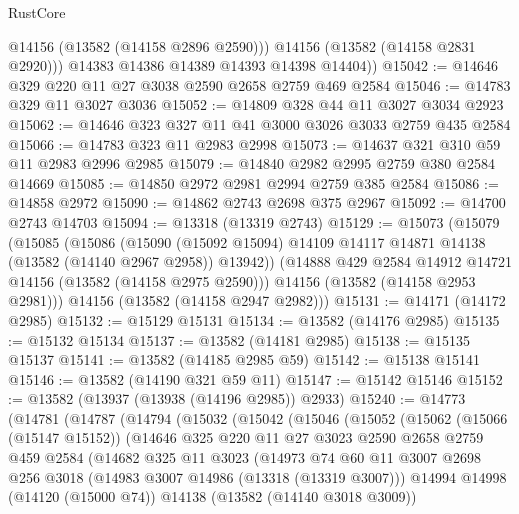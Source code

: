 \begin{lexlean}{RustCore}
\begin{coremodule}
            @14156
            (@13582 (@14158 @2896 @2590)))
          @14156
          (@13582 (@14158 @2831 @2920)))
        @14383
        @14386
        @14389
        @14393
        @14398
        @14404))
@15042 := @14646 @329 @220 @11 @27 @3038 @2590 @2658 @2759 @469 @2584
@15046 := @14783 @329 @11 @3027 @3036
@15052 := @14809 @328 @44 @11 @3027 @3034 @2923
@15062 := @14646 @323 @327 @11 @41 @3000 @3026 @3033 @2759 @435 @2584
@15066 := @14783 @323 @11 @2983 @2998
@15073 := @14637 @321 @310 @59 @11 @2983 @2996 @2985
@15079 := @14840 @2982 @2995 @2759 @380 @2584 @14669
@15085 := @14850 @2972 @2981 @2994 @2759 @385 @2584
@15086 := @14858 @2972
@15090 := @14862 @2743 @2698 @375 @2967
@15092 := @14700 @2743 @14703
@15094 := @13318 (@13319 @2743)
@15129 := @15073
    (@15079
      (@15085
        (@15086
          (@15090 (@15092 @15094) @14109 @14117 @14871 @14138 (@13582 (@14140 @2967 @2958)) @13942))
        (@14888 @429 @2584 @14912 @14721 @14156 (@13582 (@14158 @2975 @2590)))
        @14156
        (@13582 (@14158 @2953 @2981)))
      @14156
      (@13582 (@14158 @2947 @2982)))
@15131 := @14171 (@14172 @2985)
@15132 := @15129 @15131
@15134 := @13582 (@14176 @2985)
@15135 := @15132 @15134
@15137 := @13582 (@14181 @2985)
@15138 := @15135 @15137
@15141 := @13582 (@14185 @2985 @59)
@15142 := @15138 @15141
@15146 := @13582 (@14190 @321 @59 @11)
@15147 := @15142 @15146
@15152 := @13582 (@13937 (@13938 (@14196 @2985)) @2933)
@15240 := @14773
    (@14781
      (@14787
        (@14794
          (@15032
            (@15042
              (@15046
                (@15052
                  (@15062
                    (@15066 (@15147 @15152))
                    (@14646
                      @325
                      @220
                      @11
                      @27
                      @3023
                      @2590
                      @2658
                      @2759
                      @459
                      @2584
                      (@14682
                        @325
                        @11
                        @3023
                        (@14973
                          @74
                          @60
                          @11
                          @3007
                          @2698
                          @256
                          @3018
                          (@14983 @3007 @14986 (@13318 (@13319 @3007)))
                          @14994
                          @14998
                          (@14120 (@15000 @74))
                          @14138
                          (@13582 (@14140 @3018 @3009))

\end{coremodule}
\end{lexlean}
